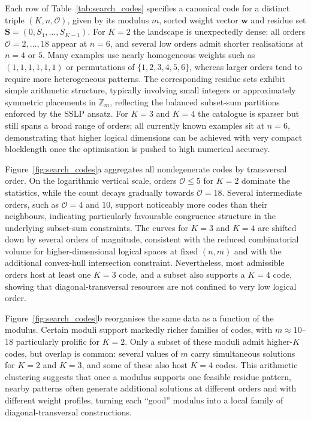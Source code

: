 \documentclass[pdflatex,sn-nature]{sn-jnl}%
\theoremstyle{thmstyleone}%
\theoremstyle{thmstyletwo}%
\theoremstyle{thmstylethree}%
\begin{document}
Each row of Table~\ref{tab:search_codes} specifies a canonical code for a distinct triple $(K,n,\mathcal{O})$, given by its modulus $m$, sorted weight vector $\mathbf{w}$ and residue set $\mathbf{S}=(0,S_1,\dots,S_{K-1})$. For $K=2$ the landscape is unexpectedly dense: all orders $\mathcal{O}=2,\dots,18$ appear at $n=6$, and several low orders admit shorter realisations at $n=4$ or $5$. Many examples use nearly homogeneous weights such as $(1,1,1,1,1,1)$ or permutations of $\{1,2,3,4,5,6\}$, whereas larger orders tend to require more heterogeneous patterns. The corresponding residue sets exhibit simple arithmetic structure, typically involving small integers or approximately symmetric placements in $\mathbb{Z}_m$, reflecting the balanced subset-sum partitions enforced by the SSLP ansatz. For $K=3$ and $K=4$ the catalogue is sparser but still spans a broad range of orders; all currently known examples sit at $n=6$, demonstrating that higher logical dimensions can be achieved with very compact blocklength once the optimisation is pushed to high numerical accuracy.

Figure~\ref{fig:search_codes}a aggregates all nondegenerate codes by transversal order. On the logarithmic vertical scale, orders $\mathcal{O}\leq 5$ for $K=2$ dominate the statistics, while the count decays gradually towards $\mathcal{O}=18$. Several intermediate orders, such as $\mathcal{O}=4$ and $10$, support noticeably more codes than their neighbours, indicating particularly favourable congruence structure in the underlying subset-sum constraints. The curves for $K=3$ and $K=4$ are shifted down by several orders of magnitude, consistent with the reduced combinatorial volume for higher-dimensional logical spaces at fixed $(n,m)$ and with the additional convex-hull intersection constraint. Nevertheless, most admissible orders host at least one $K=3$ code, and a subset also supports a $K=4$ code, showing that diagonal-transversal resources are not confined to very low logical order.

Figure~\ref{fig:search_codes}b reorganises the same data as a function of the modulus. Certain moduli support markedly richer families of codes, with $m\approx 10$–$18$ particularly prolific for $K=2$. Only a subset of these moduli admit higher-$K$ codes, but overlap is common: several values of $m$ carry simultaneous solutions for $K=2$ and $K=3$, and some of these also host $K=4$ codes. This arithmetic clustering suggests that once a modulus supports one feasible residue pattern, nearby patterns often generate additional solutions at different orders and with different weight profiles, turning each “good” modulus into a local family of diagonal-transversal constructions.
\end{document}
